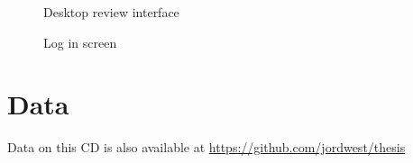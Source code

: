 \documentclass[12pt,a4paper,twoside,openright]{book}
\begin{document}
\begin{figure}[h!]
\caption{Desktop review interface}
\end{figure}

\begin{figure}[h!]
\caption{Log in screen}
\end{figure}

\chapter{Data}
Data on this CD is also available at \url{https://github.com/jordwest/thesis}
\label{appendix_cd}
\end{document}
